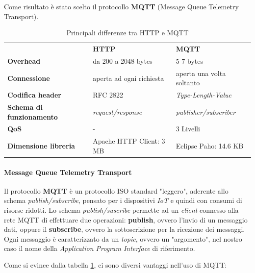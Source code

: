 \documentclass[a4paper,10pt]{memoir}
\begin{document}
Come risultato è stato scelto il protocollo \textbf{MQTT} (Message Queue Telemetry Transport).


\begin{table}[h]
\centering
\caption{Principali differenze tra HTTP e MQTT}
\label{table:mqttdiff}
\begin{tabular}{lll}
                    & \textbf{HTTP} & \textbf{MQTT} \\
\textbf{Overhead} & da 200 a 2048 bytes & 5-7 bytes \\
\textbf{Connessione} & aperta ad ogni richiesta & aperta una volta soltanto \\
\textbf{Codifica header} & RFC 2822 & \textit{Type-Length-Value} \\
\textbf{Schema di funzionamento} & \textit{request/response} & \textit{publisher/subscriber} \\
\textbf{QoS} & - & 3 Livelli \\
\textbf{Dimensione libreria} & Apache HTTP Client: 3 MB & Eclipse Paho: 14.6 KB \\
\end{tabular}
\end{table}

\paragraph{Message Queue Telemetry Transport} Il protocollo \textbf{MQTT} è un protocollo ISO standard "leggero", aderente allo schema \textit{publish/subscribe}, pensato per i dispositivi \textit{IoT} e quindi con consumi di risorse ridotti. Lo schema \textit{publish/suscribe} permette ad un \textit{client} connesso alla rete MQTT di effettuare due operazioni: \textbf{publish}, ovvero l'invio di un messaggio dati, oppure il \textbf{subscribe}, ovvero la sottoscrizione per la ricezione dei messaggi. Ogni messaggio è caratterizzato da un \textit{topic}, ovvero un "argomento", nel nostro caso il nome della \textit{Application Program Interface} di riferimento.

Come si evince dalla tabella \ref{table:mqttdiff}, ci sono diversi vantaggi nell'uso di MQTT:
\end{document}
